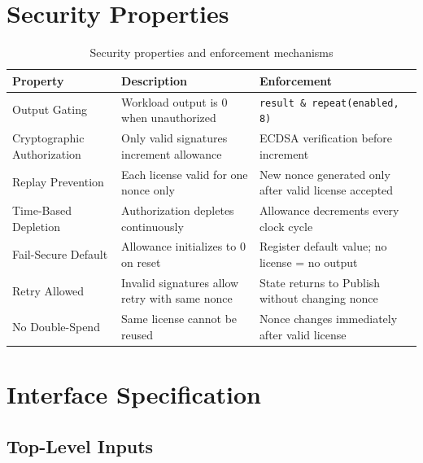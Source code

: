 \documentclass[11pt]{article}
\begin{document}
\section{Security Properties}

\begin{table}[h]
\centering
\begin{tabular}{@{}p{3.2cm}p{4.5cm}p{5.5cm}@{}}
\toprule
\textbf{Property} & \textbf{Description} & \textbf{Enforcement} \\
\midrule
Output Gating & Workload output is 0 when unauthorized & \texttt{result \& repeat(enabled, 8)} \\
\midrule
Cryptographic Authorization & Only valid signatures increment allowance & ECDSA verification before increment \\
\midrule
Replay Prevention & Each license valid for one nonce only & New nonce generated only after valid license accepted \\
\midrule
Time-Based Depletion & Authorization depletes continuously & Allowance decrements every clock cycle \\
\midrule
Fail-Secure Default & Allowance initializes to 0 on reset & Register default value; no license = no output \\
\midrule
Retry Allowed & Invalid signatures allow retry with same nonce & State returns to Publish without changing nonce \\
\midrule
No Double-Spend & Same license cannot be reused & Nonce changes immediately after valid license \\
\bottomrule
\end{tabular}
\caption{Security properties and enforcement mechanisms}
\end{table}

\section{Interface Specification}

\subsection{Top-Level Inputs}
\end{document}

